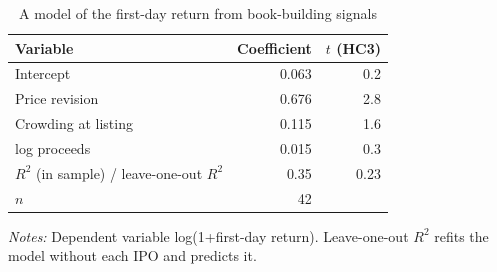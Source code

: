 \begin{table}[!htbp]\centering\footnotesize
\caption{A model of the first-day return from book-building signals}\label{tab:s9}

\begin{threeparttable}
\begin{tabular}{lrr}
\toprule
Variable & Coefficient & $t$ (HC3) \\
\midrule
Intercept & 0.063 & 0.2 \\
Price revision & 0.676 & 2.8 \\
Crowding at listing & 0.115 & 1.6 \\
log proceeds & 0.015 & 0.3 \\
\midrule
$R^2$ (in sample) / leave-one-out $R^2$ & 0.35 & 0.23 \\
$n$ & 42 & \\
\bottomrule
\end{tabular}
\begin{tablenotes}[flushleft]\footnotesize
\item \textit{Notes:} Dependent variable log(1+first-day return). Leave-one-out $R^2$ refits the model without each IPO and predicts it.
\end{tablenotes}
\end{threeparttable}

\end{table}

